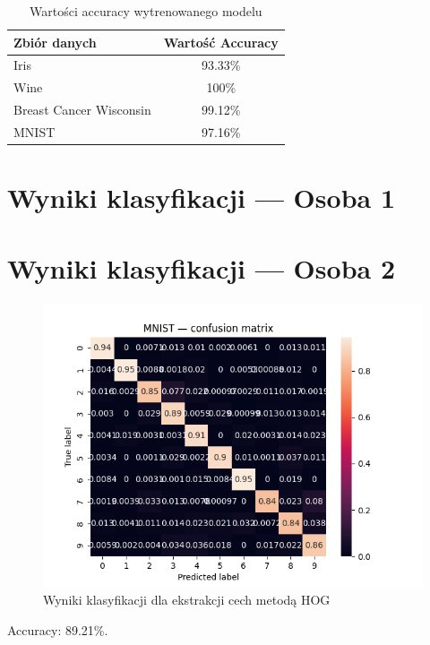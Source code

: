 \documentclass[12pt]{article}
\begin{document}
    \begin{table}[H]\centering
        \begin{tabular}{lc}
            \toprule
            Zbiór danych & Wartość Accuracy \\
            \midrule
            Iris                    & 93.33\% \\
            Wine                    & 100\% \\
            Breast Cancer Wisconsin & 99.12\% \\
            MNIST                   & 97.16\% \\
            \bottomrule
        \end{tabular}
        \caption{Wartości accuracy wytrenowanego modelu}
    \end{table}

    \pagebreak

    \section{Wyniki klasyfikacji --- Osoba 1}
    \pagebreak

    \section{Wyniki klasyfikacji --- Osoba 2}


    \begin{figure}[H]
        \centering
        \includegraphics[width=.7\linewidth]{img/mnist_hog_cm.png}
        \caption{Wyniki klasyfikacji dla ekstrakcji cech metodą HOG}
    \end{figure}

    Accuracy: 89.21\%.
\end{document}
